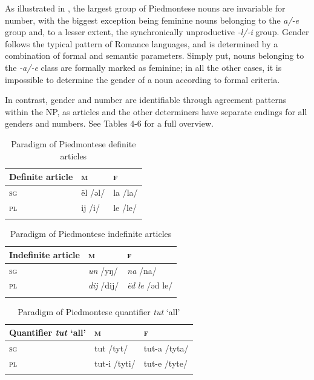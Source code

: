 \documentclass[output=paper]{langscibook}
\begin{document}
As illustrated in , the largest group of Piedmontese nouns are invariable for number, with the biggest exception being feminine nouns belonging to the \textit{a/-e} group and, to a lesser extent, the synchronically unproductive \textit{{}-l/-i} group. Gender follows the typical pattern of Romance languages, and is determined by a combination of formal and semantic parameters. Simply put, nouns belonging to the \textit{{}-a/-e} class are formally marked as feminine; in all the other cases, it is impossible to determine the gender of a noun according to formal criteria.

In contrast, gender and number are identifiable through agreement patterns within the NP, as articles and the other determiners have separate endings for all genders and numbers. See Tables 4{}-6 for a full overview.

\begin{table}
\begin{tabularx}{\textwidth}{XXl}
\lsptoprule
{ Definite article} & { \textsc{m} } & { \textsc{f}}\\
\midrule
{ \textsc{sg}} & { ël /əl/} & { la /la/}\\
{ \textsc{pl}} & { ij /i/} & { le /le/}\\
\lspbottomrule
\end{tabularx}
\caption{Paradigm of Piedmontese definite articles}
\label{tab:goria:4}
\end{table}

\begin{table}
\begin{tabularx}{\textwidth}{XXl}
\lsptoprule
{ Indefinite article} & { \textsc{m} } & { \textsc{f}}\\
\midrule
{ \textsc{sg}} & { \textit{un} /yŋ/} & { \textit{na} /na/}\\
{ \textsc{pl}} & { \textit{dij} /dij/} & { \textit{ëd} \textit{le} /əd le/}\\
\lspbottomrule
\end{tabularx}
\caption{Paradigm of Piedmontese indefinite articles}
\label{tab:goria:5}
\end{table}

\begin{table}
\begin{tabularx}{\textwidth}{XXl}
\lsptoprule
{ Quantifier \textit{tut} ‘all’} & { \textsc{m} } & { \textsc{f}}\\
\midrule
{ \textsc{sg}} & { tut /tyt/} & { tut-a /tyta/}\\
{ \textsc{pl}} & { tut-i /tyti/} & { tut-e /tyte/}\\
\lspbottomrule
\end{tabularx}
\caption{Paradigm of Piedmontese quantifier \emph{tut} ‘all’}
\label{tab:goria:6}
\end{table}
\end{document}
